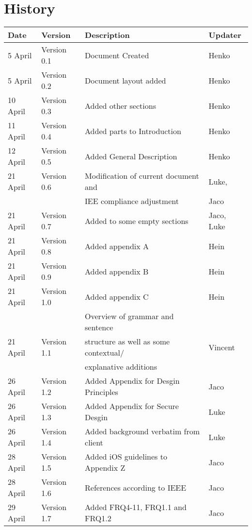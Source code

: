
\section*{History}

\begin{center}

\begin{tabular}{|l|l|l|l|}

\hline
\textbf{Date} & \textbf{Version} & \textbf{Description}&\textbf{Updater}\\ 
\hline
5 April& Version 0.1 & Document Created&Henko\\ 
\hline
5 April& Version 0.2 & Document layout added&Henko\\ 
\hline
10 April & Version 0.3 & Added other sections&Henko\\ 
\hline
11 April & Version 0.4 & Added parts to Introduction&Henko\\ 
\hline
12 April & Version 0.5 & Added General Description&Henko\\ 
\hline
21 April & Version 0.6 & Modification of current document and&Luke,\\
&& IEE compliance adjustment&Jaco\\ 
\hline
21 April & Version 0.7 & Added to some empty sections &Jaco, Luke\\ 
\hline
21 April & Version 0.8 & Added appendix A&Hein\\ 
\hline
21 April & Version 0.9 & Added appendix B&Hein\\ 
\hline
21 April & Version 1.0 & Added appendix C&Hein\\ 
\hline
			&& Overview of grammar and sentence&\\ 
21 April & Version 1.1& structure as well as some contextual/&Vincent\\
			&&explanative additions & \\
\hline
26 April & Version 1.2 & Added Appendix for Desgin Principles& Jaco\\
\hline
26 April & Version 1.3 & Added Appendix for Secure Desgin& Luke\\
\hline
26 April & Version 1.4 & Added background verbatim from client& Luke\\
\hline
28 April & Version 1.5 & Added iOS guidelines to Appendix Z& Jaco\\
\hline
28 April & Version 1.6 & References according to IEEE& Jaco\\
\hline
29 April & Version 1.7 & Added FRQ4-11, FRQ1.1 and FRQ1.2& Jaco\\

\end{tabular}
\end{center}
